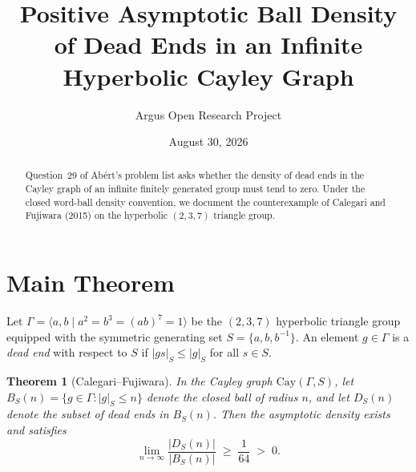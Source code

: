 \documentclass[10pt,reqno]{amsart}
\title[Dead Ends Can Have Positive Ball Density in an Infinite Cayley Graph]
{Positive Asymptotic Ball Density of Dead Ends in an Infinite Hyperbolic Cayley Graph}
\author{Argus Open Research Project}
\date{August 30, 2026}
\newtheorem{theorem}{Theorem}[section]
\theoremstyle{definition}
\begin{document}
\begin{abstract}
Question~29 of Ab\'ert's problem list asks whether the density of dead ends in the Cayley graph of an infinite finitely generated group must tend to zero. Under the closed word-ball density convention, we document the counterexample of Calegari and Fujiwara (2015) on the hyperbolic $(2,3,7)$ triangle group.
\end{abstract}
\maketitle
\section{Main Theorem}
Let $\Gamma = \langle a,b \mid a^2 = b^3 = (ab)^7 = 1\rangle$ be the $(2,3,7)$ hyperbolic triangle group equipped with the symmetric generating set $S=\{a,b,b^{-1}\}$. An element $g\in\Gamma$ is a \emph{dead end} with respect to $S$ if $|gs|_S \le |g|_S$ for all $s\in S$.
\begin{theorem}[Calegari--Fujiwara]
In the Cayley graph $\mathrm{Cay}(\Gamma,S)$, let $B_S(n)=\{g\in\Gamma : |g|_S\le n\}$ denote the closed ball of radius $n$, and let $D_S(n)$ denote the subset of dead ends in $B_S(n)$. Then the asymptotic density exists and satisfies
\[
  \lim_{n\to\infty} \frac{|D_S(n)|}{|B_S(n)|} \;\ge\; \frac{1}{64} \;>\; 0.
\]
\end{theorem}
\end{document}
